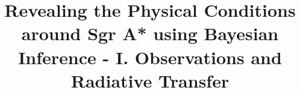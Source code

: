 \documentclass[twocolumn]{aastex631}
\begin{document}
\title{Revealing the Physical Conditions around Sgr A* using Bayesian Inference - I. Observations and Radiative Transfer}


\end{document}
